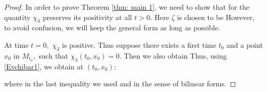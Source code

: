 \documentclass[12pt]{amsart}
\begin{document}
\begin{proof}
In order to prove Theorem \ref{thm: main 1}, we need to show that for
the quantity $\chi_3$ preserves its positivity at all $t>0.$ Here $\zeta$ is chosen to be
However, to avoid confusion, we will keep the general form as long as possible.

At time $t=0,$ $\chi_3$ is positive.
Thus suppose there exists a first time $t_0$ and a point $x_0$ in $M_{t_0},$ such that $\chi_3(t_0,x_0)=0.$
Then we also obtain
Thus, using \eqref{Evchibar1}, we obtain at $(t_0,x_0):$

where in the last inequality we used
and
in the sense of bilinear forms.


\end{proof}
\end{document}
